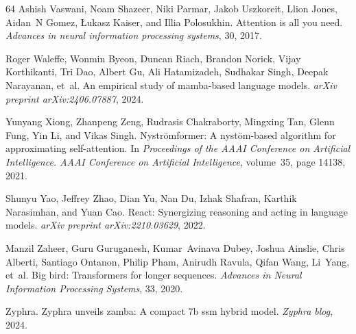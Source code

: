 \documentclass{article}
\begin{document}
\begin{thebibliography}{64}
Ashish Vaswani, Noam Shazeer, Niki Parmar, Jakob Uszkoreit, Llion Jones,
  Aidan~N Gomez, {\L}ukasz Kaiser, and Illia Polosukhin.
\newblock Attention is all you need.
\newblock \emph{Advances in neural information processing systems}, 30, 2017.

Roger Waleffe, Wonmin Byeon, Duncan Riach, Brandon Norick, Vijay Korthikanti,
  Tri Dao, Albert Gu, Ali Hatamizadeh, Sudhakar Singh, Deepak Narayanan, et~al.
\newblock An empirical study of mamba-based language models.
\newblock \emph{arXiv preprint arXiv:2406.07887}, 2024.

Yunyang Xiong, Zhanpeng Zeng, Rudrasis Chakraborty, Mingxing Tan, Glenn Fung,
  Yin Li, and Vikas Singh.
\newblock Nystr{\"o}mformer: A nyst{\"o}m-based algorithm for approximating
  self-attention.
\newblock In \emph{Proceedings of the AAAI Conference on Artificial
  Intelligence. AAAI Conference on Artificial Intelligence}, volume~35, page
  14138, 2021.

Shunyu Yao, Jeffrey Zhao, Dian Yu, Nan Du, Izhak Shafran, Karthik Narasimhan,
  and Yuan Cao.
\newblock React: Synergizing reasoning and acting in language models.
\newblock \emph{arXiv preprint arXiv:2210.03629}, 2022.

Manzil Zaheer, Guru Guruganesh, Kumar~Avinava Dubey, Joshua Ainslie, Chris
  Alberti, Santiago Ontanon, Philip Pham, Anirudh Ravula, Qifan Wang, Li~Yang,
  et~al.
\newblock Big bird: Transformers for longer sequences.
\newblock \emph{Advances in Neural Information Processing Systems}, 33, 2020.

Zyphra.
\newblock Zyphra unveils zamba: A compact 7b ssm hybrid model.
\newblock \emph{Zyphra blog}, 2024.

\end{thebibliography}


\newpage
\appendix

\end{document}
